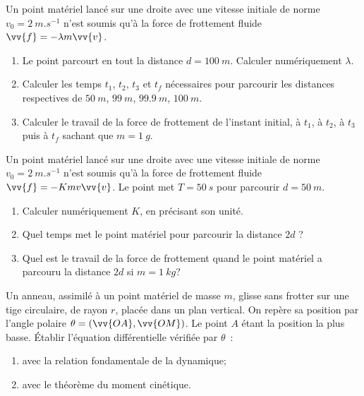 %
\begin{exercice}
  Un point matériel lancé sur une droite avec une vitesse initiale de norme $v_0 = \SI{2}{m.s^{-1}}$ n'est soumis qu'à la force de frottement fluide $\vv{f} = -\lambda m \vv{v}$.
  \begin{enumerate}
  \item Le point parcourt en tout la distance $d = \SI{100}{m}$. Calculer numériquement $\lambda$.
  \item Calculer les temps $t_1$, $t_2$, $t_3$ et $t_f$ nécessaires pour parcourir les distances respectives de $\SI{50}{m}$, $\SI{99}{m}$, $\SI{99.9}{m}$, $\SI{100}{m}$.
  \item Calculer le travail de la force de frottement de l'instant initial, à $t_1$, à $t_2$, à $t_3$ puis à $t_f$ sachant que $m=\SI{1}{g}$. 
  \end{enumerate}
\end{exercice}
%
\begin{exercice}
  Un point matériel lancé sur une droite avec une vitesse initiale de norme $v_0 = \SI{2}{m.s^{-1}}$ n'est soumis qu'à la force de frottement fluide $\vv{f} = -K m v \vv{v}$. Le point met $T=\SI{50}{s}$ pour parcourir $d=\SI{50}{m}$.
  \begin{enumerate}
  \item Calculer numériquement $K$, en précisant son unité.
  \item Quel temps met le point matériel pour parcourir la distance $2d$ ?
  \item Quel est le travail de la force de frottement quand le point matériel a parcouru la distance $2d$ si $m=\SI{1}{kg}$?
  \end{enumerate}
\end{exercice}
%
\begin{exercice}
  Un anneau, assimilé à un point matériel de masse $m$, glisse sans frotter sur une tige circulaire, de rayon $r$, placée dans un plan vertical. On repère sa position par l'angle polaire $\theta = (\vv{OA}, \vv{OM})$. Le point $A$ étant la position la plus basse. Établir l'équation différentielle vérifiée par $\theta$~:
    \begin{enumerate}
    \item avec la relation fondamentale de la dynamique;
    \item avec le théorème du moment cinétique.
    \end{enumerate}
\end{exercice}
